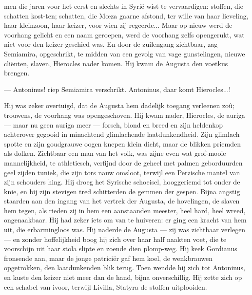 \documentclass[a4paper, 12pt, oneside, dutch]{article}
\begin{document}
men die jaren voor het eerst en slechts in Syrië wist te vervaardigen: stoffen, die schatten kost-ten; schatten, die Mœza gaarne afstond, ter wille van haar lieveling, haar kleinzoon, haar keizer, voor wien zij regeerde... Maar op nieuw werd de voorhang gelicht en een naam geroepen, werd de voorhang zelfs opengerukt, wat niet voor den keizer geschied was. En door de zuilengang zichtbaar, zag Semiamira, opgeschrikt, te midden van een gevolg van vage gunstelingen, nieuwe cliënten, slaven, Hierocles nader komen. Hij kwam de Augusta den voetkus brengen.

--- Antoninus! riep Semiamira verschrikt. Antoninus, daar komt Hierocles...!

Hij was zeker overtuigd, dat de Augusta hem dadelijk toegang verleenen zoû; trouwens, de voorhang was opengeschoven. Hij kwam nader, Hierocles, de auriga --- maar nu geen auriga meer --- forsch, blond en breed en zijn heldenkop achterover gegooid in minachtend glimlachende laatdunkendheid. Zijn glimlach spotte en zijn goudgrauwe oogen knepen klein dicht, maar de blikken priemden als dolken. Zichtbaar een man van het volk, was zijne even wat grof-mooie mannelijkheid, te athletiesch, verfijnd door de geheel met palmen geborduurden geel zijden tuniek, die zijn tors nauw omsloot, terwijl een Perzische mantel van zijn schouders hing. Hij droeg het Syrische schoeisel, hooggeriemd tot onder de knie, en bij zijn stevigen tred schitterden de gemmen der gespen. Bijna angstig staarden aan den ingang van het vertrek der Augusta, de hovelingen, de slaven hem tegen, als rieden zij in hem een aanstaanden meester, heel hard, heel wreed, ongenaakbaar. Hij had zeker iets om van te huiveren: er ging een kracht van hem uit, die erbarmingloos was. Hij naderde de Augusta --- zij was zichtbaar verlegen --- en zonder hoffelijkheid boog hij zich over haar half naakten voet, die te voorschijn uit haar stola slipte en zoende dien plomp-weg. Hij keek Gordianus fronsende aan, maar de jonge patriciër gaf hem koel, de wenkbrauwen opgetrokken, den laatdunkenden blik terug. Toen wendde hij zich tot Antoninus, en kuste den keizer niet meer dan de hand, bijna onverschillig. Hij zette zich op een schabel van ivoor, terwijl Livilla, Statyra de stoffen uitplooiden.
\end{document}
